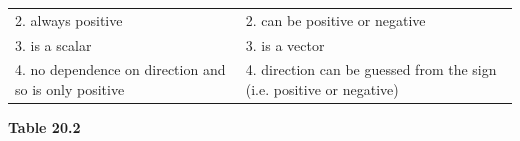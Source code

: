 {{\begin{center}
\begin{tabular}[t]{|l|l|}
    
        2. always positive &
    
    
        2. can be positive or negative%
     \tabularnewline\cline{1-1}\cline{2-2}
    
    
        3. is a scalar &
    
    
        3. is a vector%
     \tabularnewline\cline{1-1}\cline{2-2}
    
    
        4. no dependence on direction and so is only positive &
    
    
        4. direction can be guessed from the sign (i.e. positive or negative)%
     \tabularnewline\cline{1-1}\cline{2-2}
    \end{tabular}
      \end{center}
    \begin{center}{\small\bfseries Table 20.2}\end{center}
    
}}
